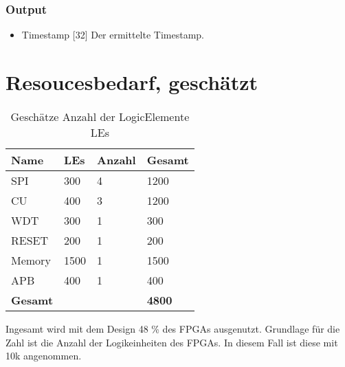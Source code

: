 \documentclass{scrreprt}
\begin{document}
\subsubsection{Output}
\begin{itemize}
\item Timestamp [32] Der ermittelte Timestamp.
\end{itemize}
\section{Resoucesbedarf, geschätzt}
\begin{table}[H]
\caption{Geschätze Anzahl der LogicElemente LEs}
\begin{tabular}{| l | l | l | l |}  \hline 
\textbf{Name} & \textbf{LEs} & \textbf{Anzahl} &\textbf{Gesamt} \\ \hline
SPI & 300 & 4 & 1200 \\ \hline
CU & 400 & 3 & 1200 \\ \hline 
WDT & 300 & 1 & 300 \\ \hline
RESET & 200 & 1 & 200 \\ \hline
Memory & 1500 & 1 & 1500 \\ \hline
APB & 400 & 1 & 400 \\ \hline 
\textbf{Gesamt} & & &  \textbf{4800} \\ \hline
\end{tabular}
\end{table}
Ingesamt wird mit dem Design 48 \% des FPGAs ausgenutzt. Grundlage für die Zahl ist die Anzahl der Logikeinheiten des FPGAs. In diesem Fall ist diese mit 10k angenommen. 
\end{document}
